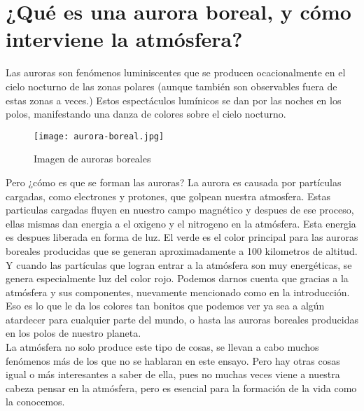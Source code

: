 \documentclass{article}
\begin{document}
\section{¿Qué es una aurora boreal, y cómo interviene la atmósfera?}
\begin{doublespace}
Las auroras son fenómenos luminiscentes que se producen ocacionalmente en el cielo nocturno de las zonas polares (aunque también son observables fuera de estas zonas a veces.) Estos espectáculos lumínicos se dan por las noches en los polos, manifestando una danza de colores sobre el cielo nocturno. \\
\begin{figure}[!ht]
\begin{center}
\texttt{[image: aurora-boreal.jpg]}
\caption{Imagen de auroras boreales}
\end{center}
\end{figure}
\pagebreak

Pero ¿cómo es que se forman las auroras? La aurora es causada por partículas cargadas, como electrones y protones, que golpean nuestra atmosfera. Estas particulas cargadas fluyen en nuestro campo magnético y despues de ese proceso, ellas mismas dan energia a el oxigeno y el nitrogeno en la atmósfera. Esta energia es despues liberada en forma de luz. El verde es el color principal para las auroras boreales producidas que se generan aproximadamente a 100 kilometros de altitud. Y cuando las partículas que logran entrar a la atmósfera son muy energéticas, se genera especialmente luz del color rojo. Podemos darnos cuenta que gracias a la atmósfera y sus componentes, nuevamente mencionado como en la introducción. Eso es lo que le da los colores tan bonitos que podemos ver ya sea a algún atardecer para cualquier parte del mundo, o hasta las auroras boreales producidas en los polos de nuestro planeta. \\ 
La atmósfera no solo produce este tipo de cosas, se llevan a cabo muchos fenómenos más de los que no se hablaran en este ensayo. Pero hay otras cosas igual o más interesantes a saber de ella, pues no muchas veces viene a nuestra cabeza pensar en la atmósfera, pero es esencial para la formación de la vida como la conocemos. 

\end{doublespace}
\pagebreak
\end{document}
